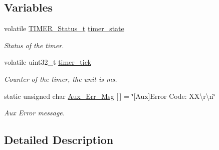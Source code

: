 \subsection*{Variables}
\begin{DoxyCompactItemize}
\item 
volatile \hyperlink{group___k_n_x___aux___exported___types_ga6ed3d972c6c5995cb3fe41995f121b41}{T\+I\+M\+E\+R\+\_\+\+Status\+\_\+t} \hyperlink{group___k_n_x___aux___private___variables_ga23c914a3038b7651aeb6bc1f444fe805}{timer\+\_\+state}\hypertarget{group___k_n_x___aux___private___variables_ga23c914a3038b7651aeb6bc1f444fe805}{}\label{group___k_n_x___aux___private___variables_ga23c914a3038b7651aeb6bc1f444fe805}

\begin{DoxyCompactList}\small\item\em Status of the timer. \end{DoxyCompactList}\item 
volatile uint32\+\_\+t \hyperlink{group___k_n_x___aux___private___variables_ga8c702713be164664bf7d3c5f9cc9002d}{timer\+\_\+tick}\hypertarget{group___k_n_x___aux___private___variables_ga8c702713be164664bf7d3c5f9cc9002d}{}\label{group___k_n_x___aux___private___variables_ga8c702713be164664bf7d3c5f9cc9002d}

\begin{DoxyCompactList}\small\item\em Counter of the timer, the unit is ms. \end{DoxyCompactList}\item 
static unsigned char \hyperlink{group___k_n_x___aux___private___variables_gab56635544aea253fe5a75ded7dda1b2f}{Aux\+\_\+\+Err\+\_\+\+Msg} \mbox{[}$\,$\mbox{]} = \char`\"{}\mbox{[}Aux\mbox{]}Error Code\+: X\+X\textbackslash{}r\textbackslash{}n\char`\"{}\hypertarget{group___k_n_x___aux___private___variables_gab56635544aea253fe5a75ded7dda1b2f}{}\label{group___k_n_x___aux___private___variables_gab56635544aea253fe5a75ded7dda1b2f}

\begin{DoxyCompactList}\small\item\em Aux Error message. \end{DoxyCompactList}\end{DoxyCompactItemize}


\subsection{Detailed Description}
